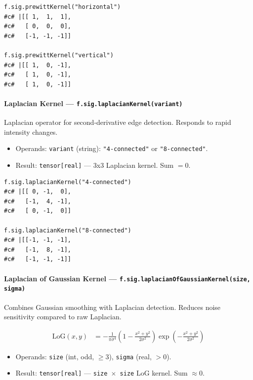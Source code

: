 \begin{verbatim}
f.sig.prewittKernel("horizontal")
#c# |[[ 1,  1,  1],
#c#   [ 0,  0,  0],
#c#   [-1, -1, -1]]

f.sig.prewittKernel("vertical")
#c# |[[ 1,  0, -1],
#c#   [ 1,  0, -1],
#c#   [ 1,  0, -1]]
\end{verbatim}

\paragraph{Laplacian Kernel --- \texttt{f.sig.laplacianKernel(variant)}}

Laplacian operator for second-derivative edge detection. Responds to rapid intensity changes.

\begin{itemize}
\item Operands: \texttt{variant} (string): \texttt{"4-connected"} or \texttt{"8-connected"}.
\item Result: \texttt{tensor[real]} --- 3x3 Laplacian kernel. Sum $= 0$.
\end{itemize}

\begin{verbatim}
f.sig.laplacianKernel("4-connected")
#c# |[[ 0, -1,  0],
#c#   [-1,  4, -1],
#c#   [ 0, -1,  0]]

f.sig.laplacianKernel("8-connected")
#c# |[[-1, -1, -1],
#c#   [-1,  8, -1],
#c#   [-1, -1, -1]]
\end{verbatim}

\paragraph{Laplacian of Gaussian Kernel --- \texttt{f.sig.laplacianOfGaussianKernel(size, sigma)}}

Combines Gaussian smoothing with Laplacian detection. Reduces noise sensitivity compared to raw Laplacian.

\begin{align}
\text{LoG}(x,y) &= -\frac{1}{\pi\sigma^4}\left(1 - \frac{x^2 + y^2}{2\sigma^2}\right) \exp\!\left(-\frac{x^2 + y^2}{2\sigma^2}\right) \label{eq:sig-log-kernel}
\end{align}

\begin{itemize}
\item Operands: \texttt{size} (int, odd, $\geq 3$), \texttt{sigma} (real, $> 0$).
\item Result: \texttt{tensor[real]} --- \texttt{size $\times$ size} LoG kernel. Sum $\approx 0$.
\end{itemize}

